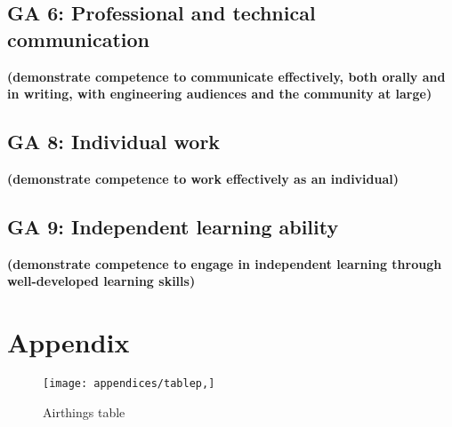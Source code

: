 \section{GA 6: Professional and technical communication}
\textbf{(demonstrate competence to communicate effectively, both orally and in writing, with engineering audiences and the community at large)  }

\section{GA 8: Individual work}
\textbf{(demonstrate competence to work effectively as an individual) }

\section{GA 9: Independent learning ability}
\textbf{(demonstrate competence to engage in independent learning through well-developed learning skills)  }



\chapter{Appendix}
\makeatletter{}\makeatother

\begin{figure}[!htb]
	\centering
	\texttt{[image: appendices/tablep,]}
	\caption{Airthings table}
	\label{fig:airthingstableappc}
\end{figure}
